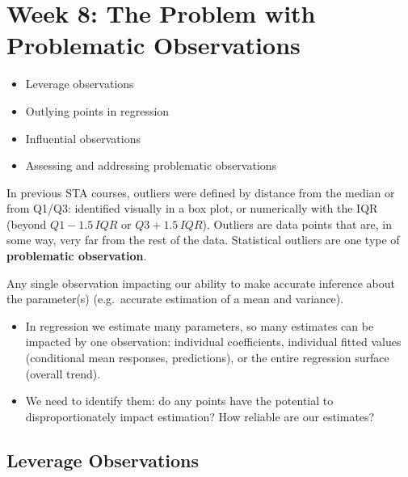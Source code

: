 
\section{Week 8: The Problem with Problematic Observations}

\begin{itemize}
    \item Leverage observations
    \item Outlying points in regression
    \item Influential observations
    \item Assessing and addressing problematic observations
\end{itemize}

\begin{remark}
    In previous STA courses, outliers were defined by distance from the median or from
    Q1/Q3: identified visually in a box plot, or numerically with the IQR (beyond
    $Q1-1.5\,IQR$ or $Q3+1.5\,IQR$). Outliers are data points that are, in some way, very far
    from the rest of the data. Statistical outliers are one type of
    \textbf{problematic observation}.
\end{remark}

\begin{definition}
    Any single observation impacting our ability to make accurate inference about the
    parameter(s) (e.g.\ accurate estimation of a mean and variance).
    \begin{itemize}
        \item In regression we estimate many parameters, so many estimates can be impacted by
        one observation: individual coefficients, individual fitted values (conditional mean
        responses, predictions), or the entire regression surface (overall trend).
        \item We need to identify them: do any points have the potential to
        disproportionately impact estimation? How reliable are our estimates?
    \end{itemize}
\end{definition}

\subsection{Leverage Observations}

